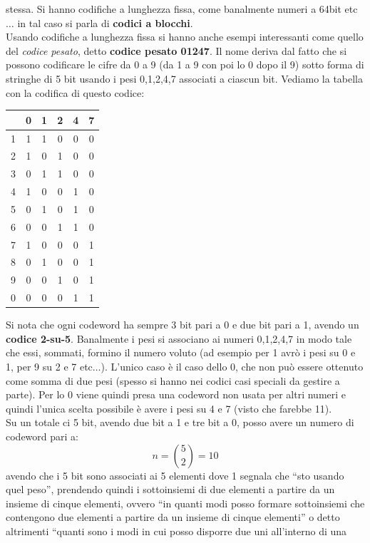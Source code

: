 \documentclass[a4paper,12pt, oneside]{book}
\begin{document}
stessa. Si hanno codifiche a lunghezza fissa, come banalmente numeri a 64bit
etc$\ldots$ in tal caso si parla di \textbf{codici a blocchi}.\\
Usando codifiche a lunghezza fissa si hanno anche esempi interessanti come
quello del \textit{codice pesato}, detto \textbf{codice pesato 01247}. Il nome
deriva dal fatto che si possono codificare le cifre da 0 a 9 (da 1 a 9 con poi
lo 0 dopo il 9) sotto forma di stringhe di 5 bit usando i pesi 0,1,2,4,7
associati a ciascun bit. Vediamo la tabella con la codifica di questo codice:
\begin{table}[H]
  \centering
  \begin{tabular}{c|ccccc} 
    & 0 & 1 & 2 & 4 & 7 \\
    \hline
    1 & 1 & 1 & 0 & 0 & 0 \\
    2 & 1 & 0 & 1 & 0 & 0 \\
    3 & 0 & 1 & 1 & 0 & 0 \\
    4 & 1 & 0 & 0 & 1 & 0 \\
    5 & 0 & 1 & 0 & 1 & 0 \\
    6 & 0 & 0 & 1 & 1 & 0 \\
    7 & 1 & 0 & 0 & 0 & 1 \\
    8 & 0 & 1 & 0 & 0 & 1 \\
    9 & 0 & 0 & 1 & 0 & 1 \\
    0 & 0 & 0 & 0 & 1 & 1
  \end{tabular}
\end{table}
Si nota che ogni codeword ha sempre 3 bit pari a 0 e due bit pari a 1, avendo un
\textbf{codice 2-su-5}. Banalmente i pesi si associano ai numeri 0,1,2,4,7 in
modo tale che essi, sommati, formino il numero voluto (ad esempio per 1 avrò i
pesi su 0 e 1, per 9 su 2 e 7 etc$\ldots$). L'unico caso è il caso dello 0, che
non può essere ottenuto come somma di due pesi (spesso si hanno nei codici casi
speciali da gestire a parte). Per lo 0 viene quindi presa una codeword non usata
per altri numeri e quindi l'unica scelta possibile è avere i pesi su 4 e 7
(visto che farebbe 11).\\
Su un totale ci 5 bit, avendo due bit a 1 e tre bit a 0, posso avere un numero
di codeword pari a:
\[n={{5}\choose{2}}=10\]
avendo che i 5 bit sono associati ai 5 elementi dove 1 segnala che ``sto usando
quel peso'', prendendo quindi i sottoinsiemi di due elementi a partire da un
insieme di cinque elementi, ovvero ``in quanti modi posso formare sottoinsiemi
che contengono due elementi a partire da un insieme di cinque elementi'' o detto
altrimenti ``quanti sono i modi in cui posso disporre due uni all'interno di una
\end{document}
